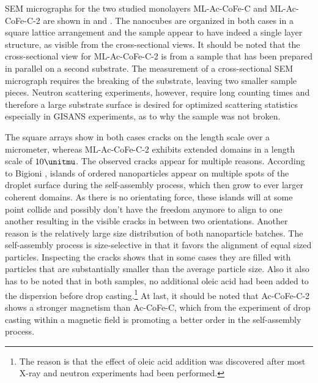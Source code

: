 \documentclass[\main/dresen_thesis.tex]{subfiles}
\begin{document}
  SEM micrographs for the two studied monolayers ML-Ac-CoFe-C and ML-Ac-CoFe-C-2 are shown in  and .
  The nanocubes are organized in both cases in a square lattice arrangement and the sample appear to have indeed a single layer structure, as visible from the cross-sectional views.
  It should be noted that the cross-sectional view for ML-Ac-CoFe-C-2 is from a sample that has been prepared in parallel on a second substrate.
  The measurement of a cross-sectional SEM micrograph requires the breaking of the substrate, leaving two smaller sample pieces.
  Neutron scattering experiments, however, require long counting times and therefore a large substrate surface is desired for optimized scattering statistics especially in GISANS experiments, as to why the sample was not broken.

  The square arrays show in both cases cracks on the length scale over a micrometer, whereas ML-Ac-CoFe-C-2 exhibits extended domains in a length scale of $10 \unitmu$.
  The observed cracks appear for multiple reasons.
  According to Bigioni \etal \cite{Bigioni_2006_Kinet}, islands of ordered nanoparticles appear on multiple spots of the droplet surface during the self-assembly process, which then grow to ever larger coherent domains.
  As there is no orientating force, these islands will at some point collide and possibly don't have the freedom anymore to align to one another resulting in the visible cracks in between two orientations.
  Another reason is the relatively large size distribution of both nanoparticle batches.
  The self-assembly process is size-selective in that it favors the alignment of equal sized particles.
  Inspecting the cracks shows that in some cases they are filled with particles that are substantially smaller than the average particle size.
  Also it also has to be noted that in both samples, no additional oleic acid had been added to the dispersion before drop casting.\footnote{The reason is that the effect of oleic acid addition was discovered after most X-ray and neutron experiments had been performed.}
  At last, it should be noted that Ac-CoFe-C-2 shows a stronger magnetism than Ac-CoFe-C, which from the experiment of drop casting within a magnetic field is promoting a better order in the self-assembly process.
\end{document}
